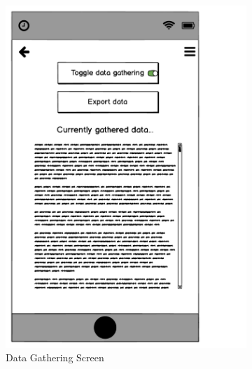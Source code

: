 \documentclass{l4proj}
\begin{document}
\begin{figure}[htbp]
\begin{subfigure}[b]{0.45\textwidth}
        \includegraphics[width=\textwidth]{images/iteration_1_data_screen_1.pdf}
        \caption{Data Gathering Screen}
        \label{fig:data_screen_1}
    \end{subfigure}
    \begin{subfigure}[b]{0.45\textwidth}

\end{subfigure}
\end{figure}
\end{document}
